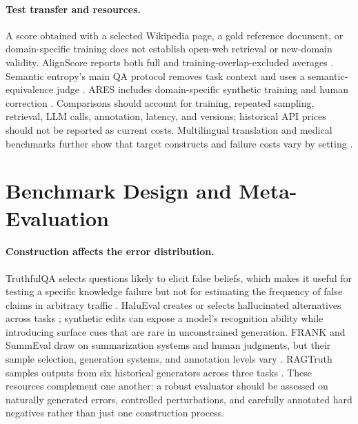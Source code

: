 \documentclass[11pt]{article}
\begin{document}
\paragraph{Test transfer and resources.} A score obtained with a selected Wikipedia page, a gold reference document, or domain-specific training does not establish open-web retrieval or new-domain validity. AlignScore reports both full and training-overlap-excluded averages \citep{C09}. Semantic entropy's main QA protocol removes task context and uses a semantic-equivalence judge \citep{C10}. ARES includes domain-specific synthetic training and human correction \citep{I044}. Comparisons should account for training, repeated sampling, retrieval, LLM calls, annotation, latency, and versions; historical API prices should not be reported as current costs. Multilingual translation and medical benchmarks further show that target constructs and failure costs vary by setting \citep{I111,I115}.

\section{Benchmark Design and Meta-Evaluation}
\paragraph{Construction affects the error distribution.} TruthfulQA selects questions likely to elicit false beliefs, which makes it useful for testing a specific knowledge failure but not for estimating the frequency of false claims in arbitrary traffic \citep{C05}. HaluEval creates or selects hallucinated alternatives across tasks \citep{C06}; synthetic edits can expose a model's recognition ability while introducing surface cues that are rare in unconstrained generation. FRANK and SummEval draw on summarization systems and human judgments, but their sample selection, generation systems, and annotation levels vary \citep{I007,I037}. RAGTruth samples outputs from six historical generators across three tasks \citep{C12}. These resources complement one another: a robust evaluator should be assessed on naturally generated errors, controlled perturbations, and carefully annotated hard negatives rather than just one construction process.
\end{document}
